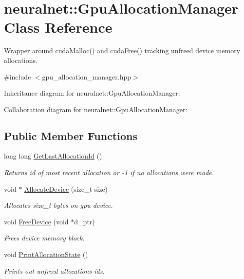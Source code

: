 \hypertarget{classneuralnet_1_1GpuAllocationManager}{}\section{neuralnet\+:\+:Gpu\+Allocation\+Manager Class Reference}
\label{classneuralnet_1_1GpuAllocationManager}


Wrapper around cuda\+Malloc() and cuda\+Free() tracking unfreed device memory allocations.  




{\ttfamily \#include $<$gpu\+\_\+allocation\+\_\+manager.\+hpp$>$}



Inheritance diagram for neuralnet\+:\+:Gpu\+Allocation\+Manager\+:


Collaboration diagram for neuralnet\+:\+:Gpu\+Allocation\+Manager\+:
\subsection*{Public Member Functions}
\begin{DoxyCompactItemize}
\item 
\mbox{\label{classneuralnet_1_1GpuAllocationManager_a005583fd4e67bd57870d30d1ed5b9f5c}} 
long long \hyperlink{classneuralnet_1_1GpuAllocationManager_a005583fd4e67bd57870d30d1ed5b9f5c}{Get\+Last\+Allocation\+Id} ()
\begin{DoxyCompactList}\small\item\em Returns id of most recent allocation or -\/1 if no allocations were made. \end{DoxyCompactList}\item 
void $\ast$ \hyperlink{classneuralnet_1_1GpuAllocationManager_ac5326b5c0b3cfe942583a2d9e858912b}{Allocate\+Device} (size\+\_\+t size)
\begin{DoxyCompactList}\small\item\em Allocates size\+\_\+t bytes on gpu device. \end{DoxyCompactList}\item 
void \hyperlink{classneuralnet_1_1GpuAllocationManager_a24bbbc0e44887a00679b04527fee7b4a}{Free\+Device} (void $\ast$d\+\_\+ptr)
\begin{DoxyCompactList}\small\item\em Frees device memory block. \end{DoxyCompactList}\item 
\mbox{\label{classneuralnet_1_1GpuAllocationManager_ab69d8bcac9451715968bd0c9326f5031}} 
void \hyperlink{classneuralnet_1_1GpuAllocationManager_ab69d8bcac9451715968bd0c9326f5031}{Print\+Allocation\+State} ()
\begin{DoxyCompactList}\small\item\em Prints out unfreed allocations ids. \end{DoxyCompactList}\end{DoxyCompactItemize}
